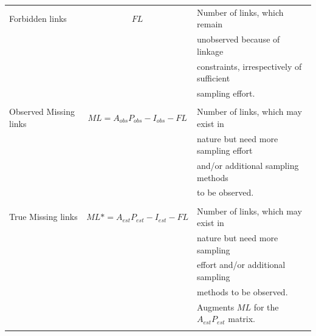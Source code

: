 \documentclass[12pt]{article}
\begin{document}
\begin{table}[ht!]
\begin{center}
\begin{tabular}{lcl}
Forbidden links&$FL$&Number of links, which remain  \\ && unobserved because of linkage \\ &&  constraints, irrespectively of sufficient  \\ && sampling effort.\\\\
Observed Missing links&$ML= A_{obs}P_{obs} - I_{obs} - FL$&Number of links, which may exist in \\ &&  nature but need more  sampling effort \\ && and\slash or additional sampling methods \\ && to be observed.\\\\
True Missing links&$ML*= A_{est}P_{est} - I_{est} - FL$&Number of links, which may exist in \\ &&  nature but need more sampling\\ && effort and\slash or additional sampling  \\ && methods to be observed.  \\ && Augments $ML$ for the $A_{est}P_{est}$ matrix.\\\\
      \hline
		\end{tabular}
 	\end{center}
\end{table}
%
\newpage
\end{document}
